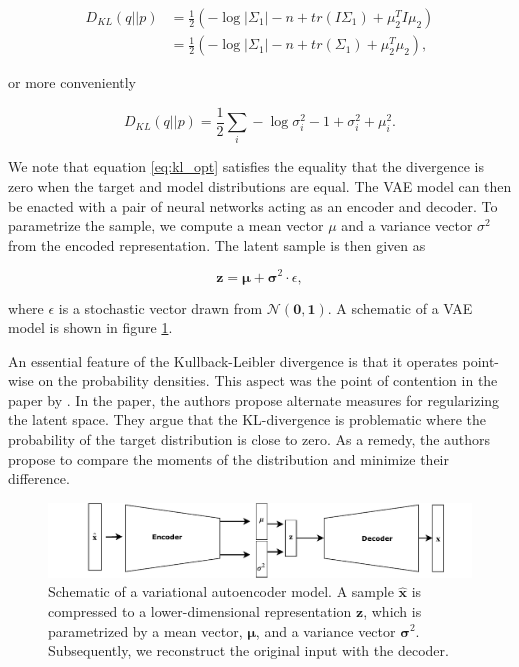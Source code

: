 \begin{align*}
D_{KL}(q||p) &= \frac{1}{2} \left( - \log {|\Sigma_1|} -n + tr(I \Sigma_1) + \mu_2 ^TI\mu_2 \right) \\
&= \frac{1}{2} \left( - \log {|\Sigma_1|} -n + tr(\Sigma_1) + \mu_2 ^T\mu_2 \right),
\end{align*}

\noindent or more conveniently

\begin{equation}\label{eq:kl_opt}
D_{KL}(q||p) = \frac{1}{2} \sum_i -\log \sigma_i^2 - 1 + \sigma^2_i + \mu_i^2 .
\end{equation}

\noindent We note that equation \ref{eq:kl_opt} satisfies the equality that the divergence is zero when the target and model distributions are equal. The VAE model can then be enacted with a pair of neural networks acting as an encoder and decoder. To parametrize the sample, we compute a mean vector $\mu$ and a variance vector $\sigma^2$ from the encoded representation. The latent sample is then given as 

\begin{equation}
\boldsymbol{z} = \boldsymbol{\mu} + \boldsymbol{\sigma}^2 \cdot \epsilon,
\end{equation} 

\noindent where $\epsilon$ is a stochastic vector drawn from $\mathcal{N}(\boldsymbol{0}, \boldsymbol{1})$. A schematic of a VAE model is shown in figure \ref{fig:var_autoencoder}.

An essential feature of the Kullback-Leibler divergence is that it operates point-wise on the probability densities. This aspect was the point of contention in the paper by \citet{Zhao}. In the paper, the authors propose alternate measures for regularizing the latent space. They argue that the KL-divergence is problematic where the probability of the target distribution is close to zero. As a remedy, the authors propose to compare the moments of the distribution and minimize their difference. 


\begin{figure}[tb]
    \centering
    \includegraphics[width=\textwidth]{plots/variational_autoenc.pdf}
    \caption[Variational autoencoder schematic]{Schematic of a variational autoencoder model. A sample $\hat{\boldsymbol{x}}$ is compressed to a lower-dimensional representation $\boldsymbol{z}$, which is parametrized by a mean vector, $\boldsymbol{\mu}$, and a variance vector $\boldsymbol{\sigma}^2$. Subsequently, we reconstruct the original input with the decoder.}
    \label{fig:var_autoencoder}
\end{figure}


